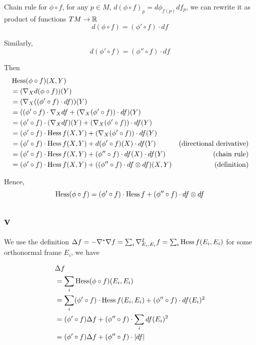 Chain rule for $\phi \circ f$, for any $p \in M$, $d(\phi \circ f)_p = d \phi_{f(p)} df_p$, we can rewrite it as product of functions $TM \to \mathbb{R}$
$$
	d(\phi \circ f) = (\phi' \circ f) \cdot df
$$

Similarly,
$$
	d(\phi' \circ f) = (\phi'' \circ f) \cdot df
$$

Then
\begin{align*}
	&\operatorname{Hess} (\phi \circ f)(X, Y) \\
	&= (\nabla_X d(\phi \circ f))(Y) \\
	&= (\nabla_X ((\phi' \circ f) \cdot df) )(Y) \\
	&= ((\phi' \circ f) \cdot \nabla_X df + (\nabla_X (\phi' \circ f)) \cdot df)(Y) \\
	&= (\phi' \circ f) \cdot (\nabla_X df) (Y) + (\nabla_X (\phi' \circ f)) \cdot df (Y) \\
	&= (\phi' \circ f) \cdot \operatorname{Hess} f(X, Y) + (\nabla_X (\phi' \circ f)) \cdot df (Y) \\
	&= (\phi' \circ f) \cdot \operatorname{Hess} f(X, Y) + d(\phi' \circ f)(X) \cdot df (Y) &\text{(directional derivative)}\\
	&= (\phi' \circ f) \cdot \operatorname{Hess} f(X, Y) + (\phi'' \circ f) \cdot df(X) \cdot df (Y) &\text{(chain rule)}\\
	&= (\phi' \circ f) \cdot \operatorname{Hess} f(X, Y) + ((\phi'' \circ f) \cdot df \otimes df)(X, Y) &\text{(definition)}\\
\end{align*}

Hence,
$$
	\operatorname{Hess} (\phi \circ f) = (\phi' \circ f) \cdot \operatorname{Hess} f + (\phi'' \circ f) \cdot df \otimes df
$$

\subsection{v}

We use the definition $\Delta f = -\nabla^* \nabla f = \sum_i \nabla^2_{E_i, E_i} f = \sum_i \operatorname{Hess} f(E_i, E_i)$ for some orthonormal frame $E_i$, we have

\begin{align*}
	&\Delta f \\
	&= \sum_i \operatorname{Hess} (\phi \circ f)(E_i, E_i) \\
	&= \sum_i (\phi' \circ f) \cdot \operatorname{Hess} f(E_i, E_i) + (\phi'' \circ f) \cdot df(E_i)^2 \\
	&= (\phi' \circ f) \Delta f + (\phi'' \circ f) \cdot \sum_{i} df(E_i)^2 \\
	&= (\phi' \circ f) \Delta f + (\phi'' \circ f) \cdot |df| \\
\end{align*}

